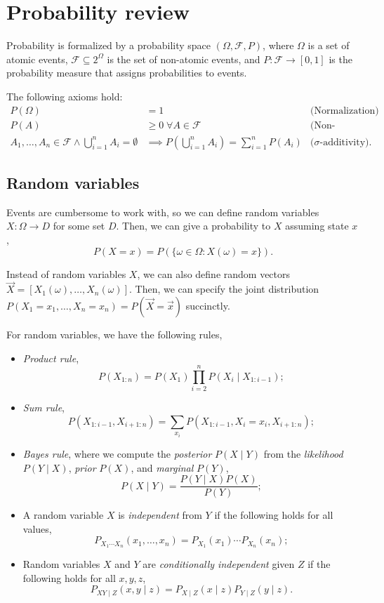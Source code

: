 \section{Probability review} \label{sec:prob-review}

Probability is formalized by a probability space $(\Omega, \mathcal{F}, P)$,
where $\Omega$ is a set of atomic events, $\mathcal{F} \subseteq 2^\Omega$ is
the set of non-atomic events, and $P: \mathcal{F}\to [0,1]$ is the
probability measure that assigns probabilities to events.

The following axioms hold:
\begin{align*}
  P(\Omega) &= 1 & \text{(Normalization)} \\
  P(A) &\geq 0 \;\forall A\in\mathcal{F} & \text{(Non-negativity)} \\
  A_1,\ldots,A_n\in\mathcal{F} \land \bigcup_{i=1}^n A_i = \emptyset &\implies P\left(\bigcup_{i=1}^n A_i\right) = \sum_{i=1}^n P(A_i) & \text{($\sigma$-additivity)}
.\end{align*}

\subsection{Random variables}

Events are cumbersome to work with, so we can define random variables
$X:\Omega\to D$ for some set $D$. Then, we can give a probability to $X$
assuming state $x$, \[
  P(X=x) = P(\{ \omega\in\Omega : X(\omega) = x \})
.\]

Instead of random variables $X$, we can also define random vectors
$\vec{X}=[X_1(\omega), \ldots, X_n(\omega)]$.  Then, we can specify the joint
distribution $P(X_1=x_1,\ldots,X_n=x_n)=P(\vec{X}=\vec{x})$ succinctly.

For random variables, we have the following rules,
\begin{itemize}
  \item \textit{Product rule}, \[
      P(X_{1:n}) = P(X_1)\prod_{i=2}^nP(X_i\mid X_{1:i-1})
    ;\]
  \item \textit{Sum rule}, \[
      P(X_{1:i-1}, X_{i+1:n}) = \sum_{x_i} P(X_{1:i-1}, X_i=x_i, X_{i+1:n})
    ;\]
  \item \textit{Bayes rule}, where we compute the \textit{posterior} $P(X\mid
    Y)$ from the \textit{likelihood} $P(Y\mid X)$, \textit{prior} $P(X)$, and
    \textit{marginal} $P(Y)$, \[
      P(X\mid Y) = \frac{P(Y\mid X)P(X)}{P(Y)}
    ;\]
  \item A random variable $X$ is \textit{independent} from $Y$ if the following
    holds for all values, \[
      P_{X_1\cdots X_n}(x_1,\ldots,x_n) = P_{X_1}(x_1)\cdots P_{X_n}(x_n)
    ;\]
  \item Random variables $X$ and $Y$ are \textit{conditionally independent}
    given $Z$ if the following holds for all $x,y,z$, \[
      P_{XY\mid Z}(x,y\mid z) = P_{X\mid Z}(x\mid z)P_{Y\mid Z}(y\mid z)
    .\]
\end{itemize}

